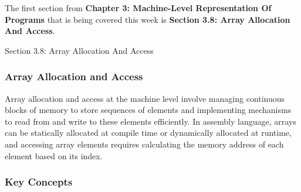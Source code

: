 The first section from \textbf{Chapter 3: Machine-Level Representation Of Programs} that is being covered this week is \textbf{Section 3.8: Array Allocation And Access}.

\begin{notes}{Section 3.8: Array Allocation And Access}
    \subsubsection*{Array Allocation and Access}

    Array allocation and access at the machine level involve managing continuous blocks of memory to store sequences of elements and implementing mechanisms to read from and write to these elements 
    efficiently. In assembly language, arrays can be statically allocated at compile time or dynamically allocated at runtime, and accessing array elements requires calculating the memory address of 
    each element based on its index. \vspace*{1em}
    
    \subsubsection*{Key Concepts}
    

\end{notes}
